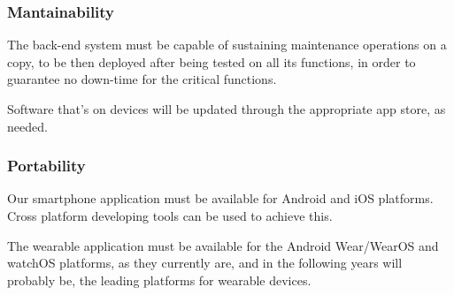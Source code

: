 \documentclass[../main.tex]{subfiles}
\begin{document}
\subsubsection{Mantainability}

The back-end system must be capable of sustaining maintenance operations on a copy, to be then deployed after being tested on all its functions, in order to guarantee no down-time for the critical functions.

Software that's on devices will be updated through the appropriate app store, as needed.

\subsubsection{Portability}

Our smartphone application must be available for Android and iOS platforms. Cross platform developing tools can be used to achieve this.

The wearable application must be available for the Android Wear/WearOS and watchOS platforms, as they currently are, and in the following years will probably be, the leading platforms for wearable devices.
\end{document}
